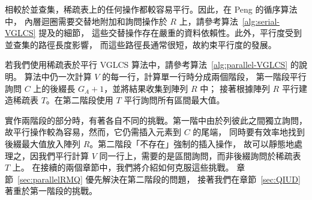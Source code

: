 相較於並查集，稀疏表上的任何操作都較容易平行。因此，在 Peng 的循序算法中，
內層迴圈需要交替地附加和詢問操作於 $R$ 上，請參考算法~\ref{alg:serial-VGLCS} 提及的細節，
這些交替操作存在嚴重的資料依賴性。此外，平行度受到並查集的路徑長度影響，
而這些路徑長通常很短，故約束平行度的發展。

若我們使用稀疏表於平行 VGLCS 算法中，請參考算法~\ref{alg:parallel-VGLCS} 的說明。
算法中仍一次計算 $V$ 的每一行，計算單一行時分成兩個階段，
第一階段平行詢問 $C$ 上的後綴長 $G_A+1$，並將結果收集到陣列 $R$ 中；
接著根據陣列 $R$ 平行建造稀疏表 $T$。在第二階段使用 $T$ 平行詢問所有區間最大值。




實作兩階段的部分時，有著各自不同的挑戰。第一階中由於列彼此之間獨立詢問，
故平行操作較為容易，然而，它仍需插入元素到 $C$ 的尾端，
同時要有效率地找到後綴最大值放入陣列 $R$。第二階段「不存在」強制的插入操作，
故可以靜態地處理之，因我們平行計算 $V$ 同一行上，需要的是區間詢問，而非後綴詢問於稀疏表 $T$ 上。
在接續的兩個章節中，我們將介紹如何克服這些挑戰。
章節~\ref{sec:parallelRMQ} 優先解決在第二階段的問題，
接著我們在章節~\ref{sec:QIUD} 著重於第一階段的挑戰。